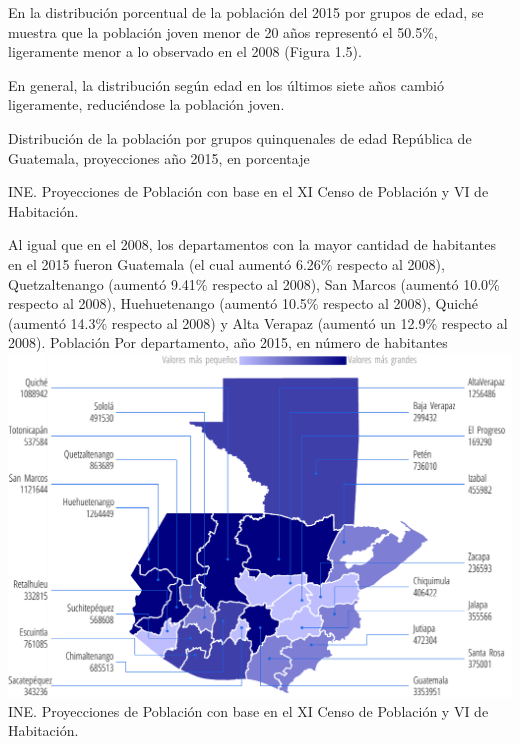 
%
{%
	En la distribución porcentual de la población del 2015 por grupos de edad, se muestra que la población joven menor de 20 años representó el 50.5\%, ligeramente menor a lo observado en el 2008 (Figura 1.5). 
	
	En general, la distribución según edad en los últimos siete años cambió ligeramente, reduciéndose la población joven. }%
{%
	Distribución de la población por grupos quinquenales de edad} %
{%
	República de Guatemala, proyecciones año 2015, en porcentaje} %
{%
	\begin{tikzpicture}[x=1pt,y=1pt]    \end{tikzpicture}}%
{INE. Proyecciones de Población con base en el XI Censo de Población y VI de Habitación.} %



%  
% 




%
{%
	Al igual que en el 2008, los departamentos con la mayor cantidad de habitantes en el 2015 fueron Guatemala (el cual aumentó 6.26\% respecto al 2008), Quetzaltenango (aumentó 9.41\% respecto al 2008), San Marcos (aumentó 10.0\% respecto al 2008), Huehuetenango (aumentó 10.5\% respecto al 2008), Quiché (aumentó 14.3\% respecto al 2008) y Alta Verapaz (aumentó un 12.9\% respecto al 2008).  }%
{%
	Población
} %
{%
	Por departamento, año 2015, en número de habitantes} %
{%
	\includegraphics[width=52\cuadri]{graficas/1_03.pdf}}%
{%
 INE. Proyecciones de Población con base en el XI Censo de Población y VI de Habitación.} %


